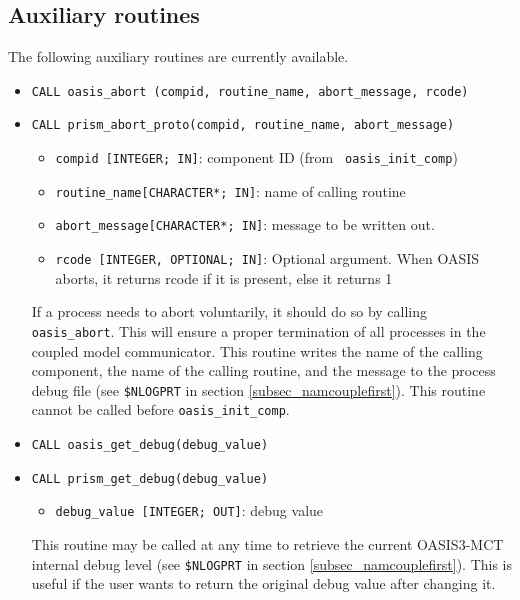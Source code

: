 
\subsection{Auxiliary routines}
\label{subsubsec_auxroutines}

The following auxiliary routines are currently available.

\begin{itemize}
\item {\tt CALL oasis\_abort (compid, routine\_name, abort\_message, rcode)}
\item {\tt CALL prism\_abort\_proto(compid, routine\_name,
    abort\_message)}
  \begin{itemize}
  \item {\tt compid [INTEGER; IN]}: component ID (from {\tt
      oasis\_init\_comp})
  \item {\tt routine\_name[CHARACTER*; IN]}: name of calling routine
  \item {\tt abort\_message[CHARACTER*; IN]}: message to be written
    out.
  \item {\tt rcode [INTEGER, OPTIONAL; IN]}: Optional argument. When OASIS 
    aborts, it returns rcode if it is present, else it returns 1
  \end{itemize}

  If a process needs to abort voluntarily, it should do so by calling
  {\tt oasis\_abort}. This will ensure a proper termination of all
  processes in the coupled model communicator. This routine writes the
  name of the calling component, the name of the calling routine, and the
  message to the process debug file (see {\tt \$NLOGPRT} in section
  \ref{subsec_namcouplefirst}).  This routine cannot be called before
  {\tt oasis\_init\_comp}.

  \vspace{0.2cm}
\item {\tt CALL oasis\_get\_debug(debug\_value)}
\item {\tt CALL prism\_get\_debug(debug\_value)}
  \begin{itemize}
  \item {\tt debug\_value [INTEGER; OUT]}: debug value
  \end{itemize}

  This routine may be called at any time to retrieve the current
  OASIS3-MCT internal debug level (see {\tt \$NLOGPRT} in section
  \ref{subsec_namcouplefirst}).  This is useful if the user wants to
  return the original debug value after changing it.


\end{itemize}
